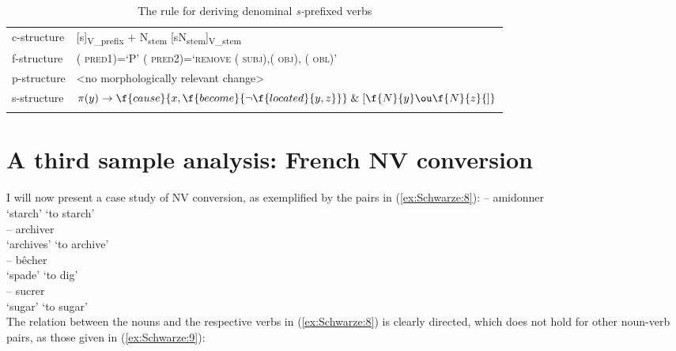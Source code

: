 \documentclass[output=paper]{langsci/langscibook}
\begin{document}
 
\begin{table}
\begin{tabular}{lp{}}
\lsptoprule

{{c-structure}} &

{[}s{]}\textsubscript{V\_prefix} + N\textsubscript{stem} \textrightarrow{}
{[}sN\textsubscript{stem}{]}\textsubscript{V\_stem}\\

{{f-structure}} &


(\textuparrow{} \textsc{pred1)=`P' \textrightarrow{} } (\textuparrow{} \textsc{pred2)=`remove (\textuparrow{} subj),(\textuparrow{} obj),
(\textuparrow{} obl)'}\\
{{p-structure}} &


\textless{}no morphologically relevant change\textgreater{}\\

{{s-structure}} &
$\pi(y) \to \f{cause}{x,\f{become}{\neg\f{located}{y,z}}} \;\&\; {[}\f{N}{y}\ou\f{N}{z} {]}$ \\
\lspbottomrule
\end{tabular}
\caption{The rule for deriving  denominal \emph{s-}prefixed verbs}
\label{tab:Schwarze:2}
\end{table}


\section{A third sample analysis: French N\textrightarrow{}V conversion}\label{a-third-sample-analysis-french-nv-conversion}


I will now present a case study of  N\textrightarrow{}V conversion, as exemplified by the pairs in (\ref{ex:Schwarze:8}):
\ea\label{ex:Schwarze:8}
    \ea {} -- {amidonner}\\
    `starch' {} {`to starch'}\\
    \ex {} -- {archiver}\\
    `archives' {} {`to archive'}\\
    \ex {} -- {bêcher}\\
    `spade' {} {`to dig'}\\
    \ex {} -- {sucrer}\\
    `sugar' {} {`to sugar'}\\
  \z
\z
The relation between the nouns and the respective verbs in (\ref{ex:Schwarze:8}) is clearly directed, which does not hold for other noun-verb pairs, as those given in (\ref{ex:Schwarze:9}):
\end{document}
